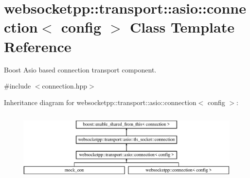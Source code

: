 \hypertarget{classwebsocketpp_1_1transport_1_1asio_1_1connection}{}\section{websocketpp\+:\+:transport\+:\+:asio\+:\+:connection$<$ config $>$ Class Template Reference}
\label{classwebsocketpp_1_1transport_1_1asio_1_1connection}


Boost Asio based connection transport component.  




{\ttfamily \#include $<$connection.\+hpp$>$}

Inheritance diagram for websocketpp\+:\+:transport\+:\+:asio\+:\+:connection$<$ config $>$\+:\begin{figure}[H]
\begin{center}
\leavevmode
\includegraphics[height=3.648208cm]{classwebsocketpp_1_1transport_1_1asio_1_1connection}
\end{center}
\end{figure}

